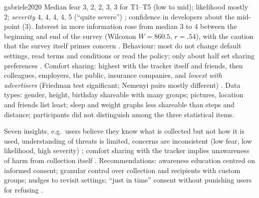 \begin{papercard}{gabriele2020}
 Median fear 3, 2, 2, 3, 3 for T1--T5 (low to mid); likelihood mostly 2; \emph{severity} 4, 4, 4, 4, 5 (``quite severe'') ; confidence in developers about the mid-point (3). Interest in more information rose from median 3 to 4 between the beginning and end of the survey (Wilcoxon $W=860.5$, $r=.54$), with the caution that the survey itself primes concern . Behaviour: most do not change default settings, read terms and conditions or read the policy; only about half set sharing preferences . Comfort sharing: highest with the tracker itself and friends, then colleagues, employers, the public, insurance companies, and \emph{lowest with advertisers} (Friedman test significant; Nemenyi pairs mostly different) . Data types: gender, height, birthday shareable with many groups; pictures, location and friends list least; sleep and weight graphs less shareable than steps and distance; participants did not distinguish among the three statistical items.

 Seven insights, e.g.\ users believe they know what is collected but not how it is used, understanding of threats is limited, concerns are inconsistent (low fear, low likelihood, high severity) ; comfort sharing with the tracker implies unawareness of harm from collection itself . Recommendations: awareness education centred on informed consent; granular control over collection and recipients with custom groups; nudges to revisit settings; ``just in time'' consent without punishing users for refusing .


\end{papercard}
